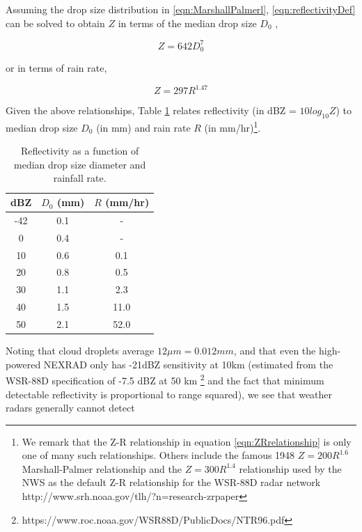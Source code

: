 \documentclass[proposal]{umassthesis}
\begin{document}
{Assuming the drop size distribution in \ref{eqn:MarshallPalmerl}, \ref{eqn:reflectivityDef} can be solved to obtain $Z$ in terms of the median drop size $D_{0}$  \cite{doviak1993doppler},

\begin{equation}
 Z = 642 D_{0}^7
\end{equation}

or in terms of rain rate,

\begin{equation}
 Z = 297 R^{1.47}
 \label{eqn:ZRrelationship}
\end{equation}

Given the above relationships, Table \ref{Radar_Table} relates reflectivity (in dBZ = $10 log_{10} Z$) to median drop size $D_{0}$ (in mm) and rain rate $R$ (in mm/hr)\footnote{We remark that the Z-R relationship in equation \ref{eqn:ZRrelationship} is only one of many such relationships. Others include the famous 1948 $Z = 200 R^{1.6}$ Marshall-Palmer relationship \cite{marshall1948distribution} and the $Z = 300 R^{1.4}$ relationship used by the NWS as the default Z-R relationship for the WSR-88D radar network http://www.srh.noaa.gov/tlh/?n=research-zrpaper}. 
\begin{table}
\begin{center}
\caption{Reflectivity as a function of median drop size diameter and rainfall rate.}
\label{Radar_Table}
\begin{tabular}{|ccc|}
\hline
dBZ &$D_{0}$ (mm) & $R$ (mm/hr) \\
\hline
-42  & 0.1 & - \\
0 & 0.4 &  - \\
10 & 0.6 & 0.1 \\
20 & 0.8 & 0.5 \\
30 & 1.1 & 2.3 \\
40 & 1.5 & 11.0 \\
50 & 2.1 & 52.0 \\
\hline
\end{tabular}
\end{center}
\end{table}
 Noting that cloud droplets average $12 \mu m = 0.012 mm$, and that even
 the high-powered NEXRAD only has -21dBZ sensitivity at 10km
 (estimated from the WSR-88D specification of -7.5 dBZ at 50 km \footnote{https://www.roc.noaa.gov/WSR88D/PublicDocs/NTR96.pdf}
 and the fact that minimum detectable reflectivity is proportional to
 range squared), we see that weather radars generally cannot detect
}
\end{document}
